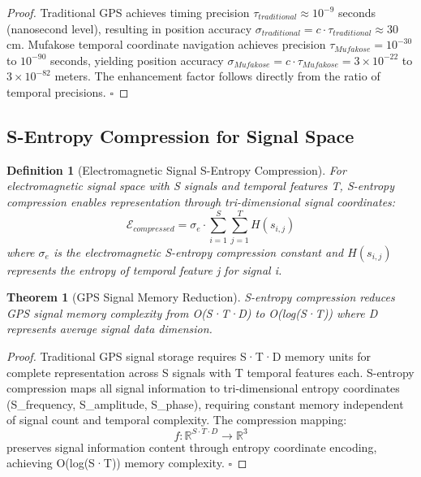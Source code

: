 \documentclass[12pt,a4paper]{article}
\newtheorem{theorem}{Theorem}
\newtheorem{definition}{Definition}
\begin{document}
\begin{proof}
Traditional GPS achieves timing precision $\tau_{traditional} \approx 10^{-9}$ seconds (nanosecond level), resulting in position accuracy $\sigma_{traditional} = c \cdot \tau_{traditional} \approx 30$ cm. Mufakose temporal coordinate navigation achieves precision $\tau_{Mufakose} = 10^{-30}$ to $10^{-90}$ seconds, yielding position accuracy $\sigma_{Mufakose} = c \cdot \tau_{Mufakose} = 3 \times 10^{-22}$ to $3 \times 10^{-82}$ meters. The enhancement factor follows directly from the ratio of temporal precisions. $\square$
\end{proof}

\subsection{S-Entropy Compression for Signal Space}

\begin{definition}[Electromagnetic Signal S-Entropy Compression]
For electromagnetic signal space with S signals and temporal features T, S-entropy compression enables representation through tri-dimensional signal coordinates:
\begin{equation}
\mathcal{E}_{compressed} = \sigma_e \cdot \sum_{i=1}^{S} \sum_{j=1}^{T} H(s_{i,j})
\end{equation}
where $\sigma_e$ is the electromagnetic S-entropy compression constant and $H(s_{i,j})$ represents the entropy of temporal feature j for signal i.
\end{definition}

\begin{theorem}[GPS Signal Memory Reduction]
S-entropy compression reduces GPS signal memory complexity from O(S·T·D) to O(log(S·T)) where D represents average signal data dimension.
\end{theorem}

\begin{proof}
Traditional GPS signal storage requires S·T·D memory units for complete representation across S signals with T temporal features each. S-entropy compression maps all signal information to tri-dimensional entropy coordinates (S_{frequency}, S_{amplitude}, S_{phase}), requiring constant memory independent of signal count and temporal complexity. The compression mapping:
\begin{equation}
f: \mathbb{R}^{S \cdot T \cdot D} \rightarrow \mathbb{R}^3
\end{equation}
preserves signal information content through entropy coordinate encoding, achieving O(log(S·T)) memory complexity. $\square$
\end{proof}
\end{document}
